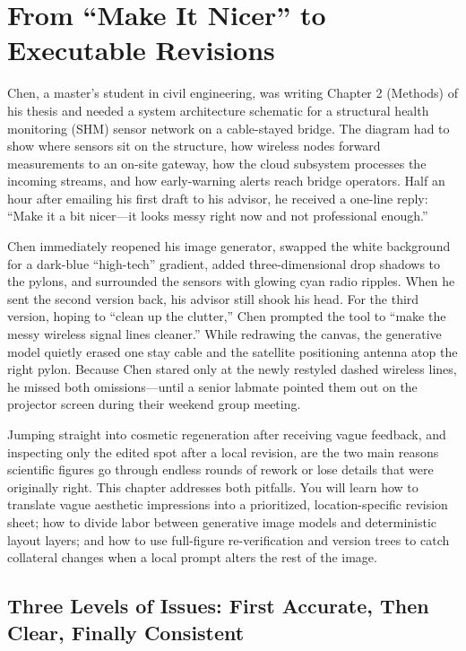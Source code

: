 \chapter{From ``Make It Nicer'' to Executable Revisions}
\usetikzlibrary{decorations.pathmorphing}

Chen, a master's student in civil engineering, was writing Chapter 2 (Methods) of his thesis and needed a system architecture schematic for a structural health monitoring (SHM) sensor network on a cable-stayed bridge. The diagram had to show where sensors sit on the structure, how wireless nodes forward measurements to an on-site gateway, how the cloud subsystem processes the incoming streams, and how early-warning alerts reach bridge operators. Half an hour after emailing his first draft to his advisor, he received a one-line reply: ``Make it a bit nicer---it looks messy right now and not professional enough.''

Chen immediately reopened his image generator, swapped the white background for a dark-blue ``high-tech'' gradient, added three-dimensional drop shadows to the pylons, and surrounded the sensors with glowing cyan radio ripples. When he sent the second version back, his advisor still shook his head. For the third version, hoping to ``clean up the clutter,'' Chen prompted the tool to ``make the messy wireless signal lines cleaner.'' While redrawing the canvas, the generative model quietly erased one stay cable and the satellite positioning antenna atop the right pylon. Because Chen stared only at the newly restyled dashed wireless lines, he missed both omissions---until a senior labmate pointed them out on the projector screen during their weekend group meeting.

Jumping straight into cosmetic regeneration after receiving vague feedback, and inspecting only the edited spot after a local revision, are the two main reasons scientific figures go through endless rounds of rework or lose details that were originally right. This chapter addresses both pitfalls. You will learn how to translate vague aesthetic impressions into a prioritized, location-specific revision sheet; how to divide labor between generative image models and deterministic layout layers; and how to use full-figure re-verification and version trees to catch collateral changes when a local prompt alters the rest of the image.

\section{Three Levels of Issues: First Accurate, Then Clear, Finally Consistent}

